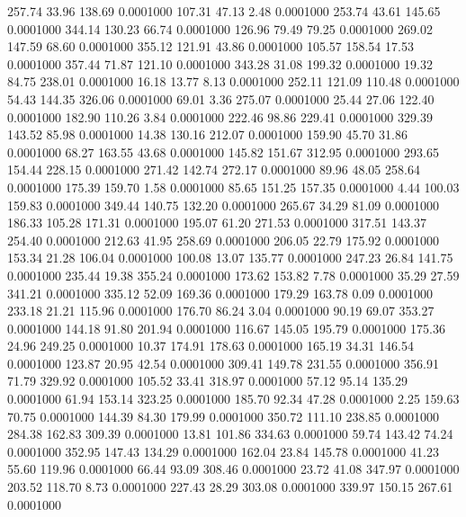  257.74   33.96  138.69   0.0001000
 107.31   47.13    2.48   0.0001000
 253.74   43.61  145.65   0.0001000
 344.14  130.23   66.74   0.0001000
 126.96   79.49   79.25   0.0001000
 269.02  147.59   68.60   0.0001000
 355.12  121.91   43.86   0.0001000
 105.57  158.54   17.53   0.0001000
 357.44   71.87  121.10   0.0001000
 343.28   31.08  199.32   0.0001000
  19.32   84.75  238.01   0.0001000
  16.18   13.77    8.13   0.0001000
 252.11  121.09  110.48   0.0001000
  54.43  144.35  326.06   0.0001000
  69.01    3.36  275.07   0.0001000
  25.44   27.06  122.40   0.0001000
 182.90  110.26    3.84   0.0001000
 222.46   98.86  229.41   0.0001000
 329.39  143.52   85.98   0.0001000
  14.38  130.16  212.07   0.0001000
 159.90   45.70   31.86   0.0001000
  68.27  163.55   43.68   0.0001000
 145.82  151.67  312.95   0.0001000
 293.65  154.44  228.15   0.0001000
 271.42  142.74  272.17   0.0001000
  89.96   48.05  258.64   0.0001000
 175.39  159.70    1.58   0.0001000
  85.65  151.25  157.35   0.0001000
   4.44  100.03  159.83   0.0001000
 349.44  140.75  132.20   0.0001000
 265.67   34.29   81.09   0.0001000
 186.33  105.28  171.31   0.0001000
 195.07   61.20  271.53   0.0001000
 317.51  143.37  254.40   0.0001000
 212.63   41.95  258.69   0.0001000
 206.05   22.79  175.92   0.0001000
 153.34   21.28  106.04   0.0001000
 100.08   13.07  135.77   0.0001000
 247.23   26.84  141.75   0.0001000
 235.44   19.38  355.24   0.0001000
 173.62  153.82    7.78   0.0001000
  35.29   27.59  341.21   0.0001000
 335.12   52.09  169.36   0.0001000
 179.29  163.78    0.09   0.0001000
 233.18   21.21  115.96   0.0001000
 176.70   86.24    3.04   0.0001000
  90.19   69.07  353.27   0.0001000
 144.18   91.80  201.94   0.0001000
 116.67  145.05  195.79   0.0001000
 175.36   24.96  249.25   0.0001000
  10.37  174.91  178.63   0.0001000
 165.19   34.31  146.54   0.0001000
 123.87   20.95   42.54   0.0001000
 309.41  149.78  231.55   0.0001000
 356.91   71.79  329.92   0.0001000
 105.52   33.41  318.97   0.0001000
  57.12   95.14  135.29   0.0001000
  61.94  153.14  323.25   0.0001000
 185.70   92.34   47.28   0.0001000
   2.25  159.63   70.75   0.0001000
 144.39   84.30  179.99   0.0001000
 350.72  111.10  238.85   0.0001000
 284.38  162.83  309.39   0.0001000
  13.81  101.86  334.63   0.0001000
  59.74  143.42   74.24   0.0001000
 352.95  147.43  134.29   0.0001000
 162.04   23.84  145.78   0.0001000
  41.23   55.60  119.96   0.0001000
  66.44   93.09  308.46   0.0001000
  23.72   41.08  347.97   0.0001000
 203.52  118.70    8.73   0.0001000
 227.43   28.29  303.08   0.0001000
 339.97  150.15  267.61   0.0001000
